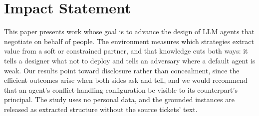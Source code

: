 \section*{Impact Statement}
This paper presents work whose goal is to advance the design of LLM agents that negotiate on behalf of people. The environment measures which strategies extract value from a soft or constrained partner, and that knowledge cuts both ways: it tells a designer what not to deploy and tells an adversary where a default agent is weak. Our results point toward disclosure rather than concealment, since the efficient outcomes arise when both sides ask and tell, and we would recommend that an agent's conflict-handling configuration be visible to its counterpart's principal. The study uses no personal data, and the grounded instances are released as extracted structure without the source tickets' text.

